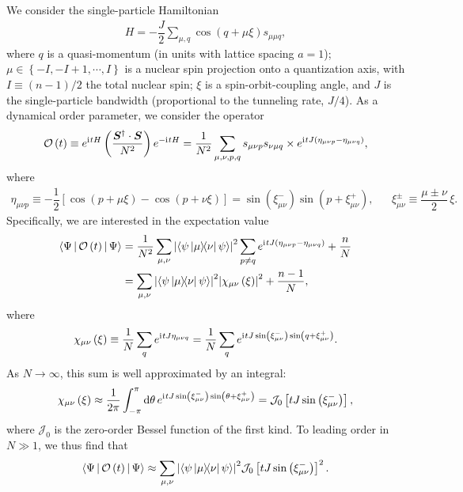\documentclass[nofootinbib,notitlepage,11pt]{revtex4-2}
\newcommand{\f}[2]{\dfrac{#1}{#2}} %
\newcommand{\p}[1]{\left(#1\right)} %
\renewcommand{\sp}[1]{\left[#1\right]} %
\renewcommand{\set}[1]{\left\{#1\right\}} %
\newcommand{\bk}{\Braket} %
\renewcommand{\v}{\bm} %
\renewcommand{\c}{\cdot} %
\renewcommand{\dd}{\text{d}} %
\renewcommand{\i}{\mathrm{i}\mkern1mu} %
\newcommand{\1}{\mathds{1}}
\newcommand{\J}{\mathcal{J}}
\renewcommand{\O}{\mathcal{O}}
\begin{document}
We consider the single-particle Hamiltonian
\begin{align}
  H = -\f{J}{2} \sum_{\mu,q} \cos\p{q + \mu\xi} s_{\mu\mu q},
\end{align}
where $q$ is a quasi-momentum (in units with lattice spacing $a=1$);
$\mu\in\set{-I,-I+1,\cdots,I}$ is a nuclear spin projection onto a
quantization axis, with $I\equiv\p{n-1}/2$ the total nuclear spin;
$\xi$ is a spin-orbit-coupling angle, and $J$ is the single-particle
bandwidth (proportional to the tunneling rate, $J/4$).  As a dynamical
order parameter, we consider the operator
\begin{align}
  \O\p{t}
  \equiv e^{\i t H} \p{\f{\v S^\dag \c\v S}{N^2}} e^{-\i t H}
  = \f1{N^2} \sum_{\mu,\nu,p,q} s_{\mu\nu p} s_{\nu\mu q} \times
  e^{\i tJ\p{\eta_{\mu\nu p}-\eta_{\mu\nu q}}},
\end{align}
where
\begin{align}
  \eta_{\mu\nu p}
  \equiv -\f12 \sp{\cos\p{p+\mu\xi} - \cos\p{p+\nu\xi}}
  = \sin\p{\xi_{\mu\nu}^-} \sin\p{p+\xi_{\mu\nu}^+},
  &&
  \xi_{\mu\nu}^\pm \equiv \f{\mu\pm\nu}{2}\,\xi.
\end{align}
Specifically, we are interested in the expectation value
\begin{align}
  \bk{\Psi|\O\p{t}|\Psi}
  &= \f1{N^2} \sum_{\mu,\nu} \abs{\bk{\psi\op{\mu}{\nu}\psi}}^2
  \sum_{p\ne q} e^{\i tJ\p{\eta_{\mu\nu p}-\eta_{\mu\nu q}}} + \f{n}{N} \\
  &= \sum_{\mu,\nu} \abs{\bk{\psi\op{\mu}{\nu}\psi}}^2
  \abs{\chi_{\mu\nu}\p{\xi}}^2 + \f{n-1}{N},
\end{align}
where
\begin{align}
  \chi_{\mu\nu}\p{\xi} \equiv \f1N \sum_q e^{\i tJ\eta_{\mu\nu q}}
  = \f1N \sum_q e^{\i tJ\sin\p{\xi_{\mu\nu}^-} \sin\p{q+\xi_{\mu\nu}^+}}.
\end{align}
As $N\to\infty$, this sum is well approximated by an integral:
\begin{align}
  \chi_{\mu\nu}\p{\xi} \approx \f1{2\pi} \int_{-\pi}^\pi \dd\theta\,
  e^{\i tJ\sin\p{\xi_{\mu\nu}^-} \sin\p{\theta+\xi_{\mu\nu}^+}}
  = \J_0\sp{tJ\sin\p{\xi_{\mu\nu}^-}},
\end{align}
where $\J_0$ is the zero-order Bessel function of the first kind.  To
leading order in $N\gg1$, we thus find that
\begin{align}
  \bk{\Psi|\O\p{t}|\Psi}
  \approx \sum_{\mu,\nu} \abs{\bk{\psi\op{\mu}{\nu}\psi}}^2
  \J_0\sp{tJ\sin\p{\xi_{\mu\nu}^-}}^2.
  \label{eq:O_time}
\end{align}
\end{document}
